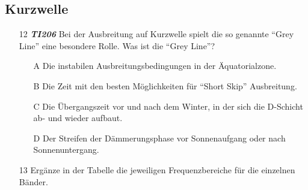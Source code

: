 \subsection*{Kurzwelle}

\begin{enumerate} 
\itemsep1pt\parskip0pt
\item[12] \emph{\textbf{TI206}}   Bei der Ausbreitung auf Kurzwelle spielt die so genannte ``Grey Line'' eine besondere Rolle. Was ist die ``Grey Line''?
	\begin{enumerate}
	\itemsep1pt\parskip0pt
		\item[A] Die instabilen Ausbreitungsbedingungen in der Äquatorialzone.
		\item[B] Die Zeit mit den besten Möglichkeiten für ``Short Skip'' Ausbreitung.
		\item[C] Die Übergangszeit vor und nach dem Winter, in der sich die D-Schicht ab- und wieder aufbaut.
		\item[D] Der Streifen der Dämmerungsphase vor Sonnenaufgang oder nach Sonnenuntergang.
	\end{enumerate}
\end{enumerate}

\begin{enumerate} 
\itemsep1pt\parskip0pt
\item[13] Ergänze in der Tabelle die jeweiligen Frequenzbereiche für die einzelnen Bänder.
\end{enumerate}


\begin{figure}[H]
\end{figure}


